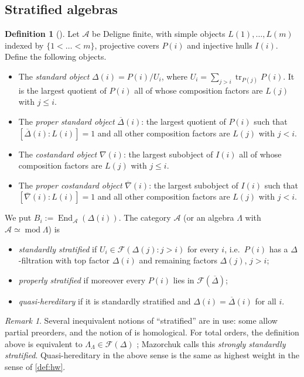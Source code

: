 \documentclass[11pt,reqno]{amsart}
\theoremstyle{plain}
\theoremstyle{definition}
\newtheorem{definition}[theorem]{Definition}
\theoremstyle{remark}
\newtheorem{remark}[theorem]{Remark}
\DeclareMathOperator{\End}{End}
\DeclareMathOperator{\tr}{tr}
\newcommand{\modd}{\operatorname{mod}}
\newcommand{\nablabar}{\overline{\nabla}}
\newcommand{\Deltabar}{\overline{\Delta}}
\newcommand{\cA}{\mathcal{A}}
\newcommand{\cF}{\mathcal{F}}
\begin{document}
\subsection{Stratified algebras}

\begin{definition}[{\cite{CPS96,Dla96,AHLU00}}]\label{def:strat}
Let $\cA$ be Deligne finite, with simple objects $L(1),\dots,L(m)$ indexed by $\{1<\dots<m\}$, projective covers $P(i)$ and injective hulls $I(i)$. Define the following objects.
\begin{itemize}
\item The \emph{standard object} $\Delta(i)=P(i)/U_i$, where $U_i=\sum_{j>i}\tr_{P(j)}P(i)$. It is the largest quotient of $P(i)$ all of whose composition factors are $L(j)$ with $j\le i$.
\item The \emph{proper standard object} $\Deltabar(i)$: the largest quotient of $P(i)$ such that $[\Deltabar(i):L(i)]=1$ and all other composition factors are $L(j)$ with $j<i$.
\item The \emph{costandard object} $\nabla(i)$: the largest subobject of $I(i)$ all of whose composition factors are $L(j)$ with $j\le i$.
\item The \emph{proper costandard object} $\nablabar(i)$: the largest subobject of $I(i)$ such that $[\nablabar(i):L(i)]=1$ and all other composition factors are $L(j)$ with $j<i$.
\end{itemize}
We put $B_i:=\End_\cA(\Delta(i))$. The category $\cA$ (or an algebra $\Lambda$ with $\cA\simeq\modd\Lambda$) is
\begin{itemize}
\item \emph{standardly stratified} if $U_i\in\cF(\Delta(j):j>i)$ for every $i$, i.e.\ $P(i)$ has a $\Delta$-filtration with top factor $\Delta(i)$ and remaining factors $\Delta(j)$, $j>i$;
\item \emph{properly stratified} if moreover every $P(i)$ lies in $\cF(\Deltabar)$;
\item \emph{quasi-hereditary} if it is standardly stratified and $\Delta(i)=\Deltabar(i)$ for all $i$.
\end{itemize}
\end{definition}

\begin{remark}
Several inequivalent notions of ``stratified'' are in use: some allow partial preorders, and the notion of \cite{CPS96} is homological. For total orders, the definition above is equivalent to $\Lambda_\Lambda\in\cF(\Delta)$ \cite{Dla96,AHLU00}; Mazorchuk \cite{Maz04} calls this \emph{strongly standardly stratified}. Quasi-hereditary in the above sense is the same as highest weight in the sense of \cref{def:hw}.
\end{remark}
\end{document}

